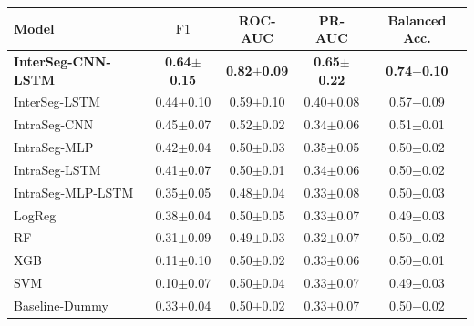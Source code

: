 \begin{tabular*}{\textwidth}{@{\extracolsep{\fill}}lcccc}
\toprule
Model & $\mathrm{F1}$ & ROC-AUC & PR-AUC & Balanced Acc. \\
\midrule
\textbf{InterSeg-CNN-LSTM} & \textbf{0.64$\pm$0.15} & \textbf{0.82$\pm$0.09} & \textbf{0.65$\pm$0.22} & \textbf{0.74$\pm$0.10} \\
InterSeg-LSTM & 0.44$\pm$0.10 & 0.59$\pm$0.10 & 0.40$\pm$0.08 & 0.57$\pm$0.09 \\
\midrule
IntraSeg-CNN & 0.45$\pm$0.07 & 0.52$\pm$0.02 & 0.34$\pm$0.06 & 0.51$\pm$0.01 \\
IntraSeg-MLP & 0.42$\pm$0.04 & 0.50$\pm$0.03 & 0.35$\pm$0.05 & 0.50$\pm$0.02 \\
IntraSeg-LSTM & 0.41$\pm$0.07 & 0.50$\pm$0.01 & 0.34$\pm$0.06 & 0.50$\pm$0.02 \\
IntraSeg-MLP-LSTM & 0.35$\pm$0.05 & 0.48$\pm$0.04 & 0.33$\pm$0.08 & 0.50$\pm$0.03 \\
\midrule
LogReg & 0.38$\pm$0.04 & 0.50$\pm$0.05 & 0.33$\pm$0.07 & 0.49$\pm$0.03 \\
RF & 0.31$\pm$0.09 & 0.49$\pm$0.03 & 0.32$\pm$0.07 & 0.50$\pm$0.02 \\
XGB & 0.11$\pm$0.10 & 0.50$\pm$0.02 & 0.33$\pm$0.06 & 0.50$\pm$0.01 \\
SVM & 0.10$\pm$0.07 & 0.50$\pm$0.04 & 0.33$\pm$0.07 & 0.49$\pm$0.03 \\
\midrule
Baseline-Dummy & 0.33$\pm$0.04 & 0.50$\pm$0.02 & 0.33$\pm$0.07 & 0.50$\pm$0.02 \\
\bottomrule
\end{tabular*}
